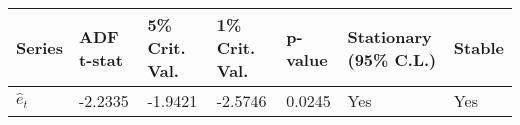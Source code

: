 \documentclass{article}
\begin{document}
    \begin{longtable}[c]{@{}lllllll@{}}
\toprule
\begin{minipage}[b]{0.10\columnwidth}\raggedright\strut
Series
\strut\end{minipage} &
\begin{minipage}[b]{0.15\columnwidth}\raggedright\strut
ADF t-stat
\strut\end{minipage} &
\begin{minipage}[b]{0.18\columnwidth}\raggedright\strut
5\% Crit. Val.
\strut\end{minipage} &
\begin{minipage}[b]{0.18\columnwidth}\raggedright\strut
1\% Crit. Val.
\strut\end{minipage} &
\begin{minipage}[b]{0.11\columnwidth}\raggedright\strut
p-value
\strut\end{minipage} &
\begin{minipage}[b]{0.31\columnwidth}\raggedright\strut
Stationary (95\% C.L.)
\strut\end{minipage} &
\begin{minipage}[b]{0.10\columnwidth}\raggedright\strut
Stable
\strut\end{minipage}\tabularnewline
\midrule
\endhead
\begin{minipage}[t]{0.10\columnwidth}\raggedright\strut
\(\hat{e}_t\)
\strut\end{minipage} &
\begin{minipage}[t]{0.15\columnwidth}\raggedright\strut
-2.2335
\strut\end{minipage} &
\begin{minipage}[t]{0.18\columnwidth}\raggedright\strut
-1.9421
\strut\end{minipage} &
\begin{minipage}[t]{0.18\columnwidth}\raggedright\strut
-2.5746
\strut\end{minipage} &
\begin{minipage}[t]{0.11\columnwidth}\raggedright\strut
0.0245
\strut\end{minipage} &
\begin{minipage}[t]{0.31\columnwidth}\raggedright\strut
Yes
\strut\end{minipage} &
\begin{minipage}[t]{0.10\columnwidth}\raggedright\strut
Yes
\strut\end{minipage}\tabularnewline
\bottomrule
\end{longtable}
\end{document}
